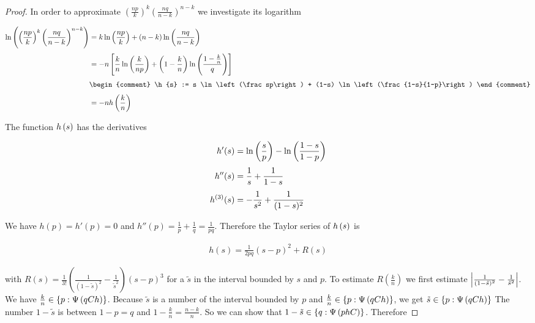 \begin{proof}
  \noindent In order to approximate $\left(\frac{np}{k}\right)^k \left(\frac{nq}{n-k}\right)^{n-k}$ we investigate its logarithm

  \begin{align}
    \ln\left(\left(\frac{np}{k}\right)^k \left(\frac{nq}{n-k}\right)^{n-k}\right) & = k \ln\left(\frac{np}{k}\right) + (n-k) \ln\left(\frac{nq}{n-k}\right) \nl
    &=-n \left[ \frac kn \ln\left(\frac{k}{np}\right) + \left(1-\frac kn\right) \ln\left(\frac{1-\frac kn}{q}\right)\right] \nl
    &
    \begin{comment}
      \h{s} := s \ln\left(\frac sp\right) + (1-s) \ln\left(\frac{1-s}{1-p}\right)
    \end{comment} \nl
    &=-n \h{\frac kn}
  \end{align}

  \noindent The function $\h{s}$ has the derivatives

  \begin{align}
    h'(s) &= \ln\left(\frac sp\right) - \ln\left(\frac{1-s}{1-p}\right) \nl
    h''(s) &= \frac 1s + \frac 1{1-s} \nl
    h^{(3)}(s) &= -\frac 1{s^2} + \frac 1{(1-s)^2}
  \end{align}

  \noindent We have $h(p)=h'(p)=0$ and $h''(p) = \frac 1p + \frac 1q = \frac 1{pq}$. Therefore the Taylor series of $\h{s}$ is

  \begin{align}
    h(s) = \frac{1}{2pq} (s-p)^2 + R(s)
  \end{align}

  with $R(s)=\frac{1}{3!} \left(\frac{1}{(1-\tilde s)^2}-\frac{1}{\tilde s^2}\right) (s-p)^3$ for a $\tilde s$ in the interval bounded by $s$ and $p$. To estimate $R\left(\frac kn\right)$ we first estimate $\abs{\frac{1}{(1-\tilde s)^2} - \frac{1}{\tilde s^2}}$. We have $\frac kn \in \ean[\bigpsi{qCh}]{p}$. Because $\tilde s$ is a number of the interval bounded by $p$ and $\frac kn\in\ean[\bigpsi{qCh}]{p}$, we get $\tilde s\in\ean[\bigpsi{qCh}]{p}$ The number $1-\tilde s$ is between $1-p=q$ and $1-\frac kn = \frac{n-k}{n}$. So we can show that $1-\tilde s\in \ean[\bigpsi{phC}]{q}$. Therefore


\end{proof}
